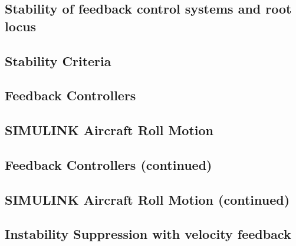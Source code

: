 \documentclass[12pt,letter]{article}
\begin{document}
\subsection{Stability of feedback control systems and root locus}


\subsection{Stability Criteria}


\subsection{Feedback Controllers}


\subsection{SIMULINK Aircraft Roll Motion}


\subsection{Feedback Controllers (continued)}


\subsection{SIMULINK Aircraft Roll Motion (continued)}


\subsection{Instability Suppression with velocity feedback}




	\pagebreak
	\renewcommand{\thepage}{}
	\renewcommand\refname{References Cited}
	\pagestyle{plain}
	
	
\end{document}
